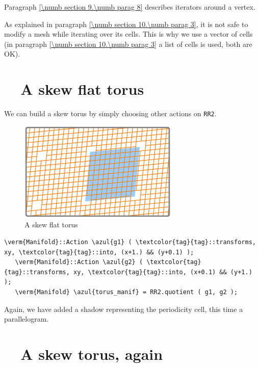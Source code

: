 Paragraph \ref{\numb section 9.\numb parag 8} describes iterators around a vertex.

As explained in paragraph \ref{\numb section 10.\numb parag 3}, it is not safe to
modify a mesh while iterating over its cells.
This is why we use a vector of cells (in paragraph \ref{\numb section 10.\numb parag 3}
a list of cells is used, both are OK).

\section{~~A skew flat torus}\label{\numb section 7.\numb parag 7}

We can build a skew torus by simply choosing other actions on {\small\tt RR2}.

\begin{figure}[ht] \centering
  \includegraphics[width=76mm]{flat-torus-3.eps}
  \caption{A skew flat torus}
  \label{\numb section 7.\numb fig 3}
\end{figure}

\begin{Verbatim}[commandchars=\\\{\},formatcom=\small\tt,frame=single,
   label=parag-\ref{\numb section 7.\numb parag 7}.cpp,rulecolor=\color{coment},
   baselinestretch=0.94,framesep=2mm                                            ]
   \verm{Manifold}::Action \azul{g1} ( \textcolor{tag}{tag}::transforms, xy, \textcolor{tag}{tag}::into, (x+1.) && (y+0.1) );
   \verm{Manifold}::Action \azul{g2} ( \textcolor{tag}{tag}::transforms, xy, \textcolor{tag}{tag}::into, (x+0.1) && (y+1.) );
   \verm{Manifold} \azul{torus_manif} = RR2.quotient ( g1, g2 );
\end{Verbatim}

Again, we have added a shadow representing the periodicity cell, this time a parallelogram.


\section{~~A skew torus, again}\label{\numb section 7.\numb parag 8}

